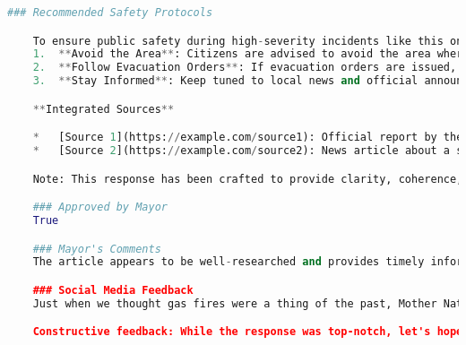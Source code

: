 \begin{lstlisting}[language=Python]
    ### Recommended Safety Protocols

    To ensure public safety during high-severity incidents like this one:
    1.  **Avoid the Area**: Citizens are advised to avoid the area where the incident is taking place until further notice.
    2.  **Follow Evacuation Orders**: If evacuation orders are issued, please follow them promptly and in an orderly manner.
    3.  **Stay Informed**: Keep tuned to local news and official announcements for updates on the situation.

    **Integrated Sources**

    *   [Source 1](https://example.com/source1): Official report by the fire department
    *   [Source 2](https://example.com/source2): News article about a similar incident

    Note: This response has been crafted to provide clarity, coherence, and credibility, while keeping the community well-informed about unfolding events and safety measures.

    ### Approved by Mayor
    True

    ### Mayor's Comments
    The article appears to be well-researched and provides timely information to the public. However, I recommend adding more details about the cause of the gas fire and any measures being taken by local authorities to prevent such incidents in the future. Additionally, it would be beneficial to include a section on how citizens can prepare themselves for similar emergencies. Overall, this article aligns with city policies and serves the community's best interests.

    ### Social Media Feedback
    Just when we thought gas fires were a thing of the past, Mother Nature decides to remind us she's still in charge! Kudos to our brave firefighters for containing this high-severity incident without any injuries. A shoutout to the swift communication from the fire department, keeping everyone informed and safe!

    Constructive feedback: While the response was top-notch, let's hope for a few less similar past incidents next time ( Case ID 32-30, we're looking at you). Seriously though, it's great to see integrated sources being utilized. Keep up the fantastic work, emergency responders! #gasfire #emergencyresponse #safetyfirst
\end{lstlisting}